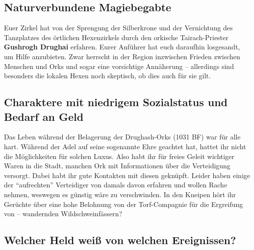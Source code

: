 \subsection*{Naturverbundene Magiebegabte}
Euer Zirkel hat von der Sprengung der Silberkrone und der Vernichtung des Tanzplatzes des örtlichen Hexenzirkels durch den orkische Tairach-Priester \textbf{Gushrogh Drughai} erfahren.
Eurer Anführer hat euch daraufhin losgesandt, um Hilfe anzubieten.
Zwar herrscht in der Region inzwischen Frieden zwischen Menschen und Orks und sogar eine vorsichtige Annäherung --
allerdings sind besonders die lokalen Hexen noch skeptisch, ob dies auch für sie gilt.

\subsection*{Charaktere mit niedrigem Sozialstatus und Bedarf an Geld}
Das Leben während der Belagerung der Drughash-Orks (1031 BF) war für alle hart.
Während der Adel auf seine sogenannte Ehre geachtet hat, hattet ihr nicht die Möglichkeiten für solchen Luxus.
Also habt ihr für freies Geleit wichtiger Waren in die Stadt, manchen Ork mit Informationen über die Verteidigung versorgt.
Dabei habt ihr gute Kontakten mit diesen geknüpft.
Leider haben einige der \enquote{aufrechten} Verteidiger von damals davon erfahren und wollen Rache nehmen, weswegen es günstig wäre zu verschwinden.
In den Kneipen hört ihr Gerüchte über eine hohe Belohnung von der Torf-Compagnie für die Ergreifung von -- wandernden Wildschweinfässern?

\spaltenende

\subsection[Wer weiß von was?]{Welcher Held weiß von welchen Ereignissen?}


\spaltenanfang



